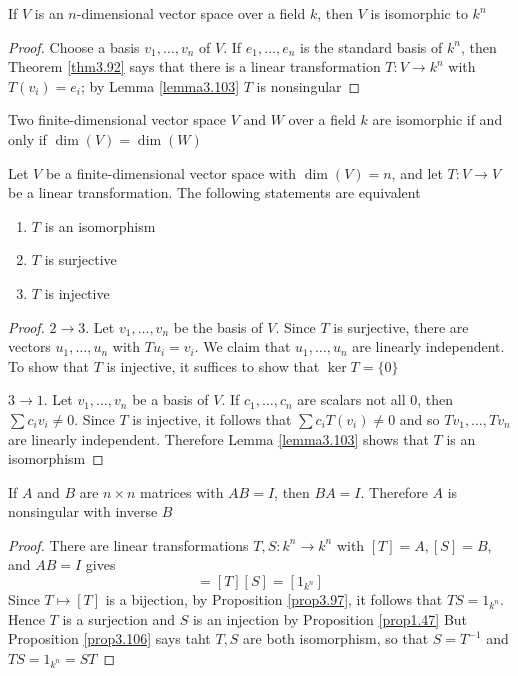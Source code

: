\documentclass[11pt]{article}
\begin{document}
\begin{theorem}[]
If \(V\) is an \(n\)-dimensional vector space over a field \(k\), then \(V\) is
isomorphic to \(k^n\)
\end{theorem}

\begin{proof}
Choose a basis \(v_1,\dots,v_n\) of \(V\). If \(e_1,\dots,e_n\) is the
standard basis of \(k^n\), then Theorem \ref{thm3.92} says that there is a
linear transformation \(T:V\to k^n\) with \(T(v_i)=e_i\); by Lemma
\ref{lemma3.103} \(T\) is nonsingular
\end{proof}

\begin{corollary}[]
Two finite-dimensional vector space \(V\) and \(W\) over a field \(k\) are
isomorphic if and only if \(\dim(V)=\dim(W)\)
\end{corollary}

\begin{proposition}[]
\label{prop3.106}
Let \(V\) be a finite-dimensional vector space with \(\dim(V)=n\), and let 
\(T:V\to V\) be a linear transformation. The following statements are
equivalent
\begin{enumerate}
\item \(T\) is an isomorphism
\item \(T\) is surjective
\item \(T\) is injective
\end{enumerate}
\end{proposition}

\begin{proof}
\(2\to 3\). Let \(v_1,\dots,v_n\) be the basis of \(V\). Since \(T\) is
surjective, there are vectors \(u_1,\dots,u_n\) with \(Tu_i=v_i\). We claim
that \(u_1,\dots,u_n\) are linearly independent. To show that \(T\) is
injective, it suffices to show that \(\ker T=\{0\}\)

\(3\to 1\). Let \(v_1,\dots,v_n\) be a basis of \(V\). If \(c_1,\dots,c_n\)
are scalars not all 0, then \(\sum c_iv_i\neq0\). Since \(T\) is injective, it
follows that \(\sum c_iT(v_i)\neq0\) and so \(Tv_1,\dots,Tv_n\) are linearly
independent. Therefore Lemma \ref{lemma3.103} shows that \(T\) is an isomorphism
\end{proof}

\begin{corollary}[]
If \(A\) and \(B\) are \(n\times n\) matrices with \(AB=I\), then \(BA=I\).
Therefore \(A\) is nonsingular with inverse \(B\)
\end{corollary}
\begin{proof}
There are linear transformations \(T,S:k^n\to k^n\) with \([T]=A,[S]=B\),
and \(AB=I\) gives
\begin{equation*}
[TS]=[T][S]=[1_{k^n}]
\end{equation*}
Since \(T\mapsto[T]\) is a bijection, by Proposition \ref{prop3.97}, it
follows that \(TS=1_{k^n}\). Hence \(T\) is a surjection and \(S\) is an
injection by Proposition \ref{prop1.47} But Proposition \ref{prop3.106} says taht \(T,S\) are both
isomorphism, so that \(S=T^{-1}\) and \(TS=1_{k^n}=ST\)
\end{proof}
\end{document}
